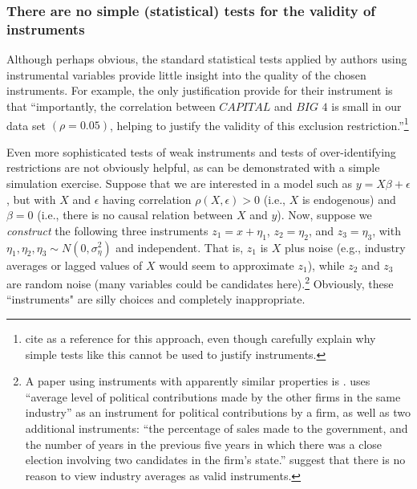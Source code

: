 \documentclass[11pt,reqno,titlepage]{amsart}
\begin{document}
\begin{doublespace}
\subsubsection{There are no simple (statistical) tests for the validity of instruments}
Although perhaps obvious, the standard statistical tests applied by authors using instrumental variables provide little insight into the quality of the chosen instruments. 
For example, the only justification \citet{Guedhami:2013cj} provide for their instrument is that ``importantly, the correlation between $\textit{CAPITAL}$ and $\textit{BIG 4}$ is small in our data set $(\rho = 0.05)$, helping to justify the validity of this exclusion restriction.''\footnote{
 \citet{Guedhami:2013cj} cite \citet{Larcker:2010fq} as a reference for this approach, even though \citet{Larcker:2010fq} carefully explain why simple tests like this cannot be used to justify instruments.}

Even more sophisticated tests of weak instruments and tests of over-identifying restrictions are not obviously helpful, as can be demonstrated with a simple simulation exercise.
Suppose that we are interested in a model such as $y = X \beta + \epsilon$, but with $X$ and $\epsilon$ having correlation $\rho(X, \epsilon) > 0$ (i.e., $X$ is endogenous) and $\beta = 0$ (i.e., there is no causal relation between $X$ and $y$). 
Now, suppose we \emph{construct} the following three instruments 
$z_1 = x +\eta_1$, $z_2 = \eta_2$, and $z_3 = \eta_3$, with $\eta_1, \eta_2,  \eta_3 \sim N(0, \sigma_{\eta}^2)$ and independent. 
That is, $z_1$ is $X$ plus noise (e.g., industry averages or lagged values of $X$ would seem to approximate $z_1$), while $z_2$ and $z_3$ are random noise (many variables could be candidates here).\footnote{A paper using instruments with apparently similar properties is \citet{Correia:2014fp}. 
\citet{Correia:2014fp} uses ``average level of political contributions made by the other firms in the same industry'' as an instrument for political contributions by a firm, as well as two additional instruments: ``the percentage of sales made to the government, and the number of years in the previous five years in which there was a close election involving two candidates in the firm's state.''  \citet{Reiss:2007ej} suggest that there is no reason to view industry averages as valid instruments.}
Obviously, these ``instruments" are silly choices and completely inappropriate.


\end{doublespace}
\end{document}
